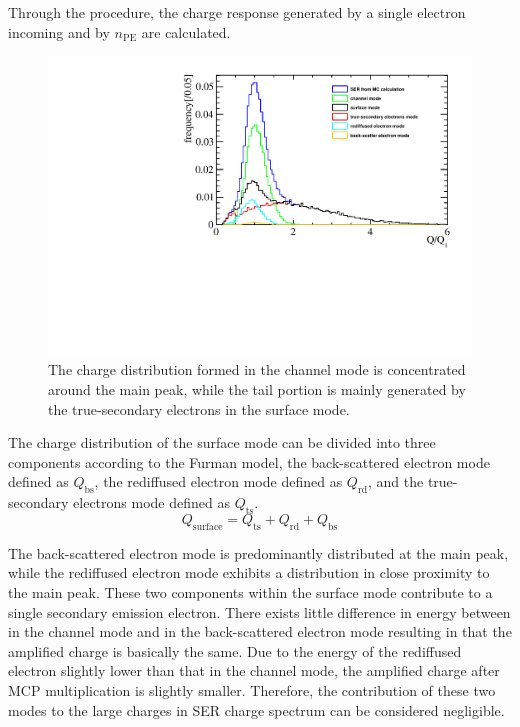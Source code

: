 Through the procedure, the charge response generated by a single electron incoming and by $n_{\mathrm{PE}}$ are calculated.
\begin{figure}[ht]
    \centering
    \includegraphics[width=0.6\linewidth]{pic/allmode.pdf}
    \caption{The charge distribution formed in the channel mode is concentrated around the main peak,
        while the tail portion is mainly generated by the true-secondary electrons in the surface mode.}
    \label{fig:allmode}
\end{figure}
The charge distribution of the surface mode can be divided into three components according to the Furman model,
the back-scattered electron mode defined as $Q_{\mathrm{bs}}$,
the rediffused electron mode defined as $Q_{\mathrm{rd}}$,
and the true-secondary electrons mode defined as $Q_{\mathrm{ts}}$.
\begin{equation}
    \label{eq:surface_3}
    Q_{\mathrm{surface}} = Q_{\mathrm{ts}}+Q_{\mathrm{rd}}+Q_{\mathrm{bs}}
\end{equation}

The back-scattered electron mode is predominantly distributed at the main peak,
while the rediffused electron mode exhibits a distribution in close proximity to the main peak.
These two components within the surface mode contribute to a single secondary emission electron.
There exists little difference in energy between in the channel mode and in the back-scattered electron mode
resulting in that the amplified charge is basically the same.
Due to the energy of the rediffused electron slightly lower than that in the channel mode,
the amplified charge after MCP multiplication is slightly smaller.
Therefore, the contribution of these two modes to the large charges in SER charge spectrum can be considered negligible.

